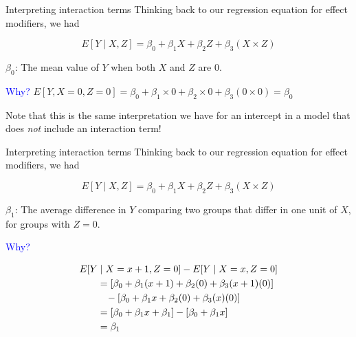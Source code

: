 \documentclass[10pt,t]{beamer}
\begin{document}
\begin{frame}{Interpreting interaction terms}
Thinking back to our regression equation for effect modifiers, we had

$$
E[Y \mid X, Z] = \beta_0 + \beta_1 X + \beta_2 Z + \beta_3 (X \times Z)
$$

$\beta_0$: The mean value of $Y$ when both $X$ and $Z$ are 0.

\vspace{0.3cm}

\textcolor{blue}{Why?} \pause $E[Y, X = 0, Z = 0] = \beta_0 + \beta_1 \times 0 + \beta_2 \times 0 + \beta_3 (0 \times 0) = \beta_0$

\pause \vspace{0.3cm}

Note that this is the same interpretation we have for an intercept in a model that does \textit{not} include an interaction term!

\end{frame}

\begin{frame}{Interpreting interaction terms}
Thinking back to our regression equation for effect modifiers, we had

$$
E[Y \mid X, Z] = \beta_0 + \beta_1 X + \beta_2 Z + \beta_3 (X \times Z)
$$

$\beta_1$: The average difference in $Y$ comparing two groups that differ in one unit of $X$, for groups with $Z = 0$.

\vspace{0.3cm}

\textcolor{blue}{Why?} \pause 

\begin{align*}
E[Y & \mid X = x + 1, Z = 0] - E[Y  \mid X = x, Z = 0] \\
& = [\beta_0 + \beta_1 (x +1) + \beta_2 (0) + \beta_3 (x + 1)(0)] \\
& \hspace{0.3cm}- [\beta_0 + \beta_1 x + \beta_2 (0) + \beta_3 (x)(0)] \\
& = [\beta_0 + \beta_1 x + \beta_1] - [\beta_0 + \beta_1 x] \\
& = \beta_1
\end{align*}

\end{frame}
\end{document}
